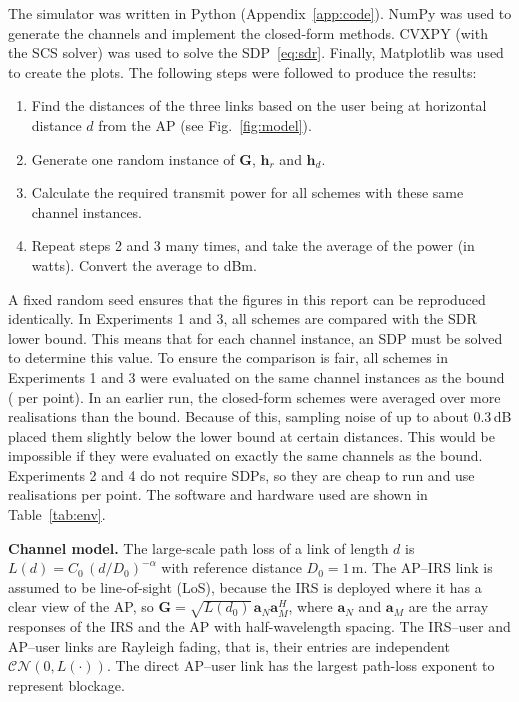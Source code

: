 \documentclass[11pt,a4paper]{article}
\newcommand{\hrv}{\bm{h}_r}
\newcommand{\hdv}{\bm{h}_d}
\newcommand{\Gm}{\bm{G}}
\begin{document}
The simulator was written in Python (Appendix~\ref{app:code}). NumPy was used to generate the channels
and implement the closed-form methods. CVXPY (with the SCS solver) was used to solve the
SDP~\eqref{eq:sdr}. Finally, Matplotlib was used to create the plots. The following steps were followed
to produce the results:
\begin{enumerate}[leftmargin=1.6em,itemsep=2pt]
\item Find the distances of the three links based on the user being at horizontal distance $d$ from the
AP (see Fig.~\ref{fig:model}).
\item Generate one random instance of $\Gm$, $\hrv$ and $\hdv$.
\item Calculate the required transmit power for all schemes with these same channel instances.
\item Repeat steps 2 and 3 many times, and take the average of the power (in watts). Convert the
average to dBm.
\end{enumerate}
A fixed random seed ensures that the figures in this report can be reproduced identically. In
Experiments 1 and 3, all schemes are compared with the SDR lower bound. This means that for each
channel instance, an SDP must be solved to determine this value. To ensure the comparison is fair, all
schemes in Experiments 1 and 3 were evaluated on the same channel instances as the bound (\nSdr{} per
point). In an earlier run, the closed-form schemes were averaged over more realisations than the bound.
Because of this, sampling noise of up to about 0.3\,dB placed them slightly below the lower bound at
certain distances. This would be impossible if they were evaluated on exactly the same channels as the
bound. Experiments 2 and 4 do not require SDPs, so they are cheap to run and use \nReal{} realisations
per point. The software and hardware used are shown in Table~\ref{tab:env}.

\begin{table}[H]
\centering
\caption{Software environment of the simulations.}
\label{tab:env}
\tableEnv
\end{table}

\textbf{Channel model.} The large-scale path loss of a link of length $d$ is
$L(d)=C_0\,(d/D_0)^{-\alpha}$ with reference distance $D_0=1$\,m. The AP--IRS link is assumed to be
line-of-sight (LoS), because the IRS is deployed where it has a clear view of the AP, so
$\Gm=\sqrt{L(d_0)}\,\bm{a}_N\bm{a}_M^H$, where $\bm{a}_N$ and $\bm{a}_M$ are the array responses of the
IRS and the AP with half-wavelength spacing. The IRS--user and AP--user links are Rayleigh fading,
that is, their entries are independent $\mathcal{CN}(0,L(\cdot))$. The direct AP--user link has the
largest path-loss exponent to represent blockage.
\end{document}
